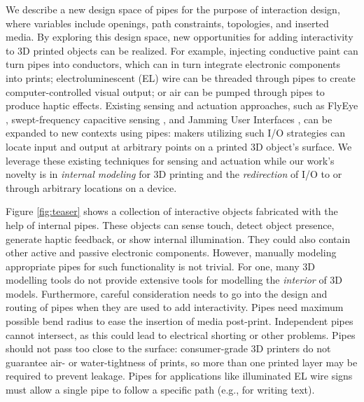 We describe a new design space of pipes for the purpose of interaction design, where variables include openings, path constraints, topologies, and inserted media. By exploring this design space, new opportunities for adding interactivity to 3D printed objects can be realized. For example, injecting conductive paint can turn pipes into conductors, which can in turn integrate electronic components into prints; electroluminescent (EL) wire can be threaded through pipes to create computer-controlled visual output; or air can be pumped through pipes to produce haptic effects.  Existing sensing and actuation approaches, such as FlyEye \cite{Wimmer-flyeye}, swept-frequency capacitive sensing \cite{Sato-touche}, and Jamming User Interfaces \cite{Follmer-jamming}, can be expanded to new contexts using pipes: makers utilizing such I/O strategies can locate input and output at arbitrary points on a printed 3D object's surface.  We leverage these existing techniques for sensing and actuation while our work's novelty is in \emph{internal modeling} for 3D printing and the \emph{redirection} of I/O to or through arbitrary locations on a device.


Figure \ref{fig:teaser} shows a collection of interactive objects fabricated with the help of internal pipes. These objects can sense touch, detect object presence, generate haptic feedback, or show internal illumination. They could also contain other active and passive electronic components. However, manually modeling appropriate pipes for such functionality is not trivial.  For one, many 3D modelling tools do not provide extensive tools for modelling the  {\em interior} of 3D models. Furthermore, careful consideration needs to go into the design and routing of pipes when they are used to add interactivity. Pipes need maximum possible bend radius to ease the insertion of media post-print.  Independent pipes cannot intersect, as this could lead to electrical shorting or other problems.  Pipes should not pass too close to the surface: consumer-grade 3D printers do not guarantee air- or water-tightness of prints, so more than one printed layer may be required to prevent leakage.  Pipes for applications like illuminated EL wire signs must allow a single pipe to follow a specific path (e.g., for writing text). 

